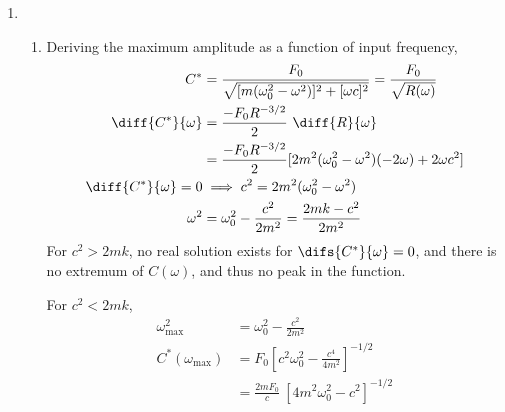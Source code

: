 \begin{enumerate}
    \item
          \begin{enumerate}
              \item Deriving the maximum amplitude as a function of input frequency,
                    \begin{align}
                        C^{*}                    & = \frac{F_{0}}{\sqrt{[m(\omega_{0}^{2}
                                - \omega^{2})]^{2} + [\omega c]^{2}}}
                        = \frac{F_{0}}{\sqrt{R(\omega)}}                                                                \\
                        \diff {C^{*}}{\omega}    & = \frac{-F_{0}R^{-3/2}}{2}\ \diff {R}{\omega}                        \\
                                                 & = \frac{-F_{0}R^{-3/2}}{2} [2m^{2}(\omega_{0}^{2}
                        - \omega^{2})(-2\omega) + 2\omega c^{2}]                                                        \\
                        \diff{C^{*}}{\omega} = 0 & \implies c^{2} = 2m^{2}(\omega_{0}^{2} - \omega^{2})                 \\
                        \omega^{2}               & = \omega_{0}^{2} - \frac{c^{2}}{2m^{2}} = \frac{2mk - c^{2}}{2m^{2}} \\
                    \end{align}
                    For $ c^{2} > 2mk $, no real solution exists for $ \difs {C^{*}}{\omega} = 0$, and there is
                    no extremum of $ C(\omega) $, and thus no peak in the function. \par
                    For $ c^{2} < 2mk $,
                    \begin{align}
                        \omega_{\text{max}}^{2}    & = \omega_{0}^{2} - \frac{c^{2}}{2m^{2}}                                \\
                        C^{*}(\omega_{\text{max}}) & = F_{0}\left[ c^{2}\omega_{0}^{2} - \frac{c^{4}}{4m^{2}}\right]^{-1/2} \\
                                                   & = \frac{2mF_{0}}{c}\ [4m^{2}\omega_{0}^{2} - c^{2}]^{-1/2}
                    \end{align}


\end{enumerate}
\end{enumerate}
